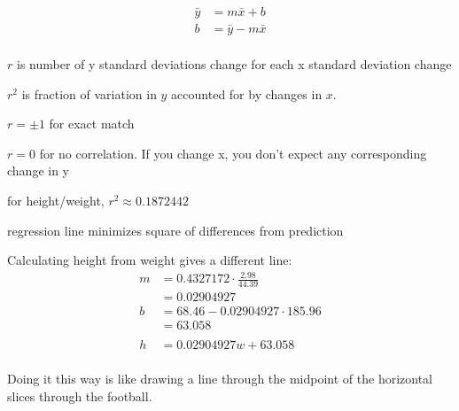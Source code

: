 \documentclass[letterpaper, landscape]{exam}
\begin{document}
  \begin{align*}
    \bar{y} & = m \bar{x} + b \\
    b       & = \bar{y} - m \bar{x} \\
  \end{align*}

  \begin{itemize*}
    \item $r$ is number of y standard deviations change for each x standard
      deviation change 

    \item $r^2$ is fraction of variation in $y$ accounted for by changes in $x$.

    \item $r = \pm 1$ for exact match

    \item $r = 0$ for no correlation.  If you change x, you don't expect any
      corresponding change in y

    \item for height/weight, $r^2 \approx 0.1872442$

    \item regression line minimizes square of differences from prediction
  \end{itemize*}

  Calculating height from weight gives a different line:
  \begin{align*}
    m & = 0.4327172 \cdot \frac{2.98}{44.39} \\
      & = 0.02904927 \\
    b & = 68.46 - 0.02904927 \cdot 185.96 \\
      & = 63.058 \\
    \\
    h & = 0.02904927 w + 63.058 \\
  \end{align*}

  Doing it this way is like drawing a line through the midpoint of the horizontal slices
  through the football.
\end{document}

